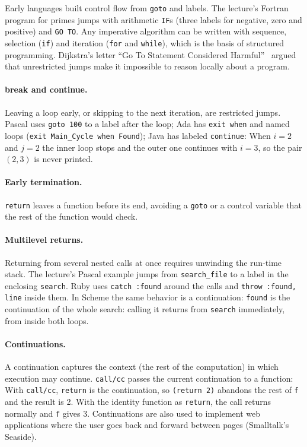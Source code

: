 Early languages built control flow from \texttt{goto} and labels. The
lecture's Fortran program for primes jumps with arithmetic \texttt{IF}s (three
labels for negative, zero and positive) and \texttt{GO TO}. Any imperative
algorithm can be written with sequence, selection (\texttt{if}) and iteration
(\texttt{for} and \texttt{while}), which is the basis of structured
programming. Dijkstra's letter ``Go To Statement Considered
Harmful''~\cite{dijkstra1968goto} argued that unrestricted jumps make it
impossible to reason locally about a program.

\paragraph{break and continue.} Leaving a loop early, or skipping to the next
iteration, are restricted jumps. Pascal uses \texttt{goto 100} to a label after
the loop; Ada has \texttt{exit when} and named loops (\texttt{exit Main\_Cycle
when Found}); Java has labeled \texttt{continue}:
When $i = 2$ and $j = 2$ the inner loop stops and the outer one continues with
$i = 3$, so the pair $(2, 3)$ is never printed.

\paragraph{Early termination.} \texttt{return} leaves a function before its end,
avoiding a \texttt{goto} or a control variable that the rest of the function
would check.

\paragraph{Multilevel returns.} Returning from several nested calls at once
requires unwinding the run-time stack. The lecture's Pascal example jumps
from \texttt{search\_file} to a label in the enclosing \texttt{search}. Ruby
uses \texttt{catch :found} around the calls and \texttt{throw :found, line}
inside them. In Scheme the same behavior is a continuation:
\texttt{found} is the continuation of the whole search: calling it returns
from \texttt{search} immediately, from inside both loops.

\paragraph{Continuations.} A continuation captures the context (the rest of the
computation) in which execution may continue. \texttt{call/cc} passes the
current continuation to a function:
With \texttt{call/cc}, \texttt{return} is the continuation, so \texttt{(return 2)}
abandons the rest of \texttt{f} and the result is 2. With the identity function
as \texttt{return}, the call returns normally and \texttt{f} gives 3.
Continuations are also used to implement web applications where the user
goes back and forward between pages (Smalltalk's Seaside).

